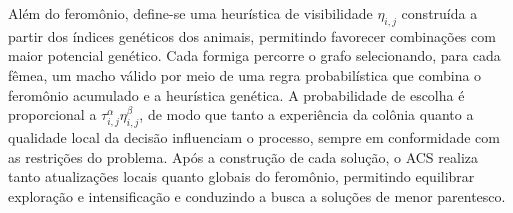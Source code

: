 Além do feromônio, define-se uma heurística de visibilidade \(\eta_{i,j}\) construída a partir dos índices genéticos dos animais, permitindo favorecer combinações com maior potencial genético. 
Cada formiga percorre o grafo selecionando, para cada fêmea, um macho válido por meio de uma regra probabilística que combina o feromônio acumulado e a heurística genética. A probabilidade de escolha é proporcional a \(\tau_{i,j}^{\alpha}\eta_{i,j}^{\beta}\), de modo que tanto a experiência da colônia quanto a qualidade local da decisão influenciam o processo, sempre em conformidade com as restrições do problema.
Após a construção de cada solução, o ACS realiza tanto atualizações locais quanto globais do feromônio, permitindo equilibrar exploração e intensificação e conduzindo a busca a soluções de menor parentesco.

